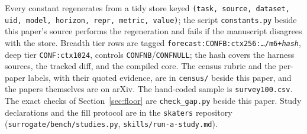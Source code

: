 \documentclass[11pt]{article}
\theoremstyle{remark}
\begin{document}
Every constant regenerates from a tidy store keyed
\texttt{(task, source, dataset, uid, model, horizon, repr, metric, value)};
the script \texttt{constants.py} beside this paper's source performs the
regeneration and fails if the manuscript disagrees with the store.
Breadth tier rows are tagged \texttt{forecast:CONFB:ctx256:\ldots/m6+\textit{hash}},
deep tier \texttt{CONF:ctx1024}, controls \texttt{CONFNB}/\texttt{CONFNULL};
the hash covers the harness sources, the tracked diff, and the compiled core.
The census rubric and the per-paper labels, with their quoted evidence, are in
\texttt{census/} beside this paper, and the papers themselves are on arXiv. The
hand-coded sample is \texttt{survey100.csv}. The exact checks of
Section~\ref{sec:floor} are \texttt{check\_gap.py} beside this paper. Study declarations and the fill protocol are in the \texttt{skaters}
repository (\texttt{surrogate/bench/studies.py}, \texttt{skills/run-a-study.md}).
\end{document}
